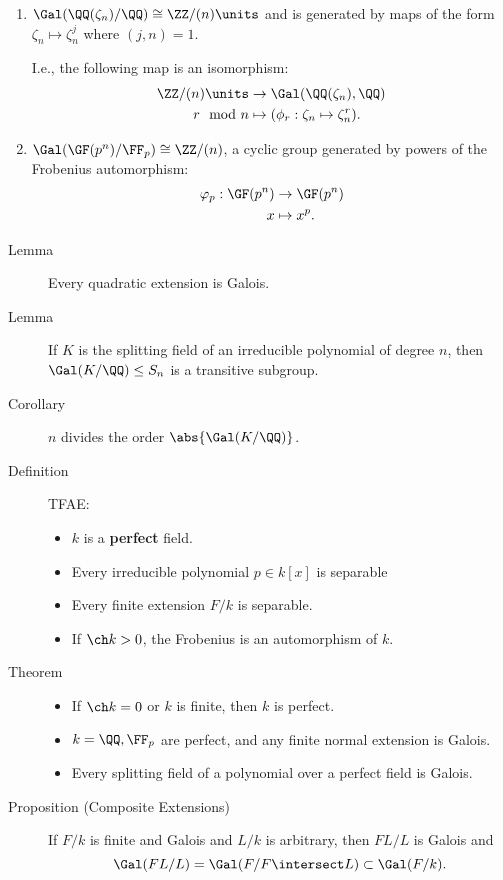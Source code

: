 \begin{enumerate}
\def\labelenumi{\arabic{enumi}.}
\item
  \(\Gal(\QQ(\zeta_n)/\QQ) \cong \ZZ/(n)\units\) and is generated by
  maps of the form \(\zeta_n \mapsto \zeta_n^j\) where \((j, n) = 1\).

  I.e., the following map is an isomorphism: \begin{align*}
  \ZZ/(n)\units &\to \Gal(\QQ(\zeta_n), \QQ) \\
  r \mod n &\mapsto (\phi_r: \zeta_n \mapsto \zeta_n^r )
  .\end{align*}
\item
  \(\Gal(\GF(p^n)/\FF_p) \cong \ZZ/(n)\), a cyclic group generated by
  powers of the Frobenius automorphism: \begin{align*}
  \varphi_p: \GF(p^n) &\to \GF(p^n) \\
  x &\mapsto x^p
  .\end{align*}
\end{enumerate}

\begin{description}
\item[Lemma]
Every quadratic extension is Galois.
\item[Lemma]
If \(K\) is the splitting field of an irreducible polynomial of degree
\(n\), then \(\Gal(K/\QQ) \leq S_n\) is a transitive subgroup.
\item[Corollary]
\(n\) divides the order \(\abs{ \Gal(K/\QQ)}\).
\item[Definition]
TFAE:

\begin{itemize}
\item
  \(k\) is a \textbf{perfect} field.
\item
  Every irreducible polynomial \(p\in k[x]\) is separable
\item
  Every finite extension \(F/k\) is separable.
\item
  If \(\ch k > 0\), the Frobenius is an automorphism of \(k\).
\end{itemize}
\item[Theorem]
\hfill

\begin{itemize}
\item
  If \(\ch k = 0\) or \(k\) is finite, then \(k\) is perfect.
\item
  \(k = \QQ, \FF_p\) are perfect, and any finite normal extension is
  Galois.
\item
  Every splitting field of a polynomial over a perfect field is Galois.
\end{itemize}
\item[Proposition (Composite Extensions)]
If \(F/k\) is finite and Galois and \(L/k\) is arbitrary, then \(FL/L\)
is Galois and \[
\Gal(FL/L) = \Gal(F / F\intersect L) \subset \Gal(F/k)
.\]
\end{description}

